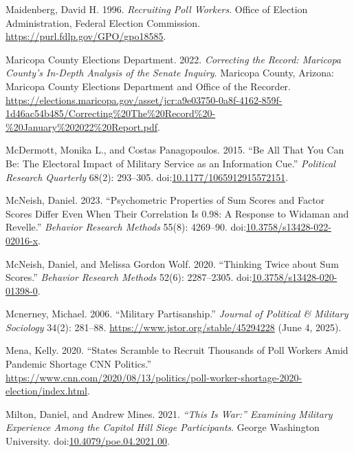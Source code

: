 \documentclass[
  12pt,
  letterpaper,
]{article}
\newlength{\cslhangindent}
\newenvironment{CSLReferences}[2] %
 {\begin{list}{}{%
  \setlength{\itemindent}{0pt}
  \setlength{\leftmargin}{0pt}
  \setlength{\parsep}{0pt}
  \ifodd #1
   \setlength{\leftmargin}{\cslhangindent}
   \setlength{\itemindent}{-1\cslhangindent}
  \fi
  \setlength{\itemsep}{#2\baselineskip}}}
 {\end{list}}
\begin{document}
\begin{CSLReferences}{1}{1}
Maidenberg, David H. 1996. \emph{Recruiting {Poll Workers}}. Office of
Election Administration, Federal Election Commission.
\url{https://purl.fdlp.gov/GPO/gpo18585}.

Maricopa County Elections Department. 2022. \emph{Correcting the
{Record}: {Maricopa County}'s {In-Depth Analysis} of the {Senate
Inquiry}}. Maricopa County, Arizona: {Maricopa County Elections
Department and Office of the Recorder}.
\url{https://elections.maricopa.gov/asset/jcr:a9e03750-0a8f-4162-859f-1d46ac54b485/Correcting\%20The\%20Record\%20-\%20January\%202022\%20Report.pdf}.

McDermott, Monika L., and Costas Panagopoulos. 2015. {``Be {All} That
{You Can Be}: {The Electoral Impact} of {Military Service} as an
{Information Cue}.''} \emph{Political Research Quarterly} 68(2):
293--305.
doi:\href{https://doi.org/10.1177/1065912915572151}{10.1177/1065912915572151}.

McNeish, Daniel. 2023. {``Psychometric Properties of Sum Scores and
Factor Scores Differ Even When Their Correlation Is 0.98: {A} Response
to {Widaman} and {Revelle}.''} \emph{Behavior Research Methods} 55(8):
4269--90.
doi:\href{https://doi.org/10.3758/s13428-022-02016-x}{10.3758/s13428-022-02016-x}.

McNeish, Daniel, and Melissa Gordon Wolf. 2020. {``Thinking Twice about
Sum Scores.''} \emph{Behavior Research Methods} 52(6): 2287--2305.
doi:\href{https://doi.org/10.3758/s13428-020-01398-0}{10.3758/s13428-020-01398-0}.

Mcnerney, Michael. 2006. {``Military {Partisanship}.''} \emph{Journal of
Political \& Military Sociology} 34(2): 281--88.
\url{https://www.jstor.org/stable/45294228} (June 4, 2025).

Mena, Kelly. 2020. {``States Scramble to Recruit Thousands of Poll
Workers Amid Pandemic Shortage \textbar{} {CNN Politics}.''}
\url{https://www.cnn.com/2020/08/13/politics/poll-worker-shortage-2020-election/index.html}.

Milton, Daniel, and Andrew Mines. 2021. \emph{{``{This} Is {War}:''}
{Examining Military Experience Among} the {Capitol Hill Siege
Participants}}. George Washington University.
doi:\href{https://doi.org/10.4079/poe.04.2021.00}{10.4079/poe.04.2021.00}.


\end{CSLReferences}
\end{document}

